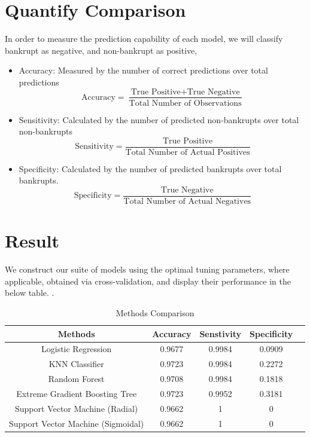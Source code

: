 \documentclass[12pt]{report}
\begin{document}
\section{Quantify Comparison}
In order to measure the prediction capability of each model, we will classify bankrupt as negative, and non-bankrupt as positive,
\begin{itemize}
    \item Accuracy: Measured by the number of correct predictions over total predictions
    \begin{equation}
        \text{Accuracy} = \frac{\text{True Positive} + \text{True Negative}}{\text{Total Number of Observations}}
    \end{equation}

    \item Sensitivity: Calculated by the number of predicted non-bankrupts over total non-bankrupts
    \begin{equation}
        \text{Sensitivity} = \frac{\text{True Positive}}{\text{Total Number of Actual Positives}}
    \end{equation}

    \item Specificity: Calculated by the number of predicted bankrupts over total bankrupts.
    \begin{equation}
        \text{Specificity} = \frac{\text{True Negative}}{\text{Total Number of Actual Negatives}}
    \end{equation}
\end{itemize}
\section{Result}

 We construct our suite of models using the optimal tuning parameters, where applicable, obtained via cross-validation, and display their performance in the below table. .

\begin{table}[ht]
\doublespacing
\centering
\caption{Methods Comparison}
\begin{tabular}{ccccc}
\label{modelcomp}
\textbf{Methods}          & \textbf{Accuracy} & \textbf{Senstivity} & \textbf{Specificity} \\ \hline
Logistic Regression       & 0.9677                  & 0.9984              & 0.0909              \\
KNN Classifier            & 0.9723                & 0.9984             & 0.2272             \\
Random Forest             & 0.9708                  & 0.9984              & 0.1818              \\
Extreme Gradient Boosting Tree & 0.9723           & 0.9952              & 0.3181 \\
Support Vector Machine (Radial) & 0.9662           & 1              & 0             \\  
Support Vector Machine (Sigmoidal) & 0.9662           & 1             & 0
\end{tabular}

\end{table}
\end{document}
